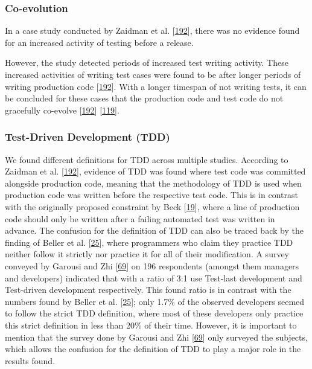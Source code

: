 \documentclass[]{book}
\begin{document}
\subsubsection{Co-evolution}\label{co-evolution}

In a case study conducted by Zaidman et al.
{[}\protect\hyperlink{ref-zaidman2011studying}{192}{]}, there was no
evidence found for an increased activity of testing before a release.

However, the study detected periods of increased test writing activity.
These increased activities of writing test cases were found to be after
longer periods of writing production code
{[}\protect\hyperlink{ref-zaidman2011studying}{192}{]}. With a longer
timespan of not writing tests, it can be concluded for these cases that
the production code and test code do not gracefully co-evolve
{[}\protect\hyperlink{ref-zaidman2011studying}{192}{]}
{[}\protect\hyperlink{ref-marsavina2014}{119}{]}.

\subsubsection{Test-Driven Development
(TDD)}\label{test-driven-development-tdd}

We found different definitions for TDD across multiple studies.
According to Zaidman et al.
{[}\protect\hyperlink{ref-zaidman2011studying}{192}{]}, evidence of TDD
was found where test code was committed alongside production code,
meaning that the methodology of TDD is used when production code was
written before the respective test code. This is in contrast with the
originally proposed constraint by Beck
{[}\protect\hyperlink{ref-beck2003test}{19}{]}, where a line of
production code should only be written after a failing automated test
was written in advance. The confusion for the definition of TDD can also
be traced back by the finding of Beller et al.
{[}\protect\hyperlink{ref-beller2015}{25}{]}, where programmers who
claim they practice TDD neither follow it strictly nor practice it for
all of their modification. A survey conveyed by Garousi and Zhi
{[}\protect\hyperlink{ref-GAROUSI20131354}{69}{]} on 196 respondents
(amongst them managers and developers) indicated that with a ratio of
3:1 use Test-last development and Test-driven development respectively.
This found ratio is in contrast with the numbers found by Beller et al.
{[}\protect\hyperlink{ref-beller2015}{25}{]}; only 1.7\% of the observed
developers seemed to follow the strict TDD definition, where most of
these developers only practice this strict definition in less than 20\%
of their time. However, it is important to mention that the survey done
by Garousi and Zhi {[}\protect\hyperlink{ref-GAROUSI20131354}{69}{]}
only surveyed the subjects, which allows the confusion for the
definition of TDD to play a major role in the results found.
\end{document}
